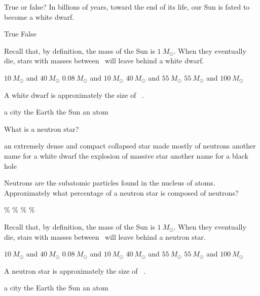 \documentclass[addpoints]{exam}
\begin{document}
\begin{questions}
\question
True or false? In billions of years, toward the end of its life, our Sun is fated to become a white dwarf.

\begin{randomizechoices}
\correctchoice True
\choice False
\end{randomizechoices}

\question 
Recall that, by definition, the mass of the Sun is $\SI{1}{M_{\odot}}$. When they eventually die, stars with masses between \fillin[][4cm]\ will leave behind a white dwarf.

\begin{randomizechoices}
\choice $\SI{10}{M_{\odot}}$ and $\SI{40}{M_{\odot}}$
\correctchoice $\SI{0.08}{M_{\odot}}$ and $\SI{10}{M_{\odot}}$
\choice $\SI{40}{M_{\odot}}$ and $\SI{55}{M_{\odot}}$
\choice $\SI{55}{M_{\odot}}$ and $\SI{100}{M_{\odot}}$
\end{randomizechoices}

\question
A white dwarf is approximately the size of \fillin\ .

\begin{randomizechoices}
\choice a city
\correctchoice the Earth
\choice the Sun
\choice an atom
\end{randomizechoices}

\clearpage
\question
What is a neutron star?

\begin{randomizechoices}
\correctchoice an extremely dense and compact collapsed star made mostly of neutrons
\choice another name for a white dwarf
\choice the explosion of massive star
\choice another name for a black hole
\end{randomizechoices}

\question
Neutrons are the subatomic particles found in the nucleus of atoms. Approximately what percentage of a neutron star is composed of neutrons?

\begin{randomizechoices}
\%
\%
\%
\%
\end{randomizechoices}

\question 
Recall that, by definition, the mass of the Sun is $\SI{1}{M_{\odot}}$. When they eventually die, stars with masses between \fillin[][4cm]\ will leave behind a neutron star.

\begin{randomizechoices}
\correctchoice $\SI{10}{M_{\odot}}$ and $\SI{40}{M_{\odot}}$
\choice $\SI{0.08}{M_{\odot}}$ and $\SI{10}{M_{\odot}}$
\choice $\SI{40}{M_{\odot}}$ and $\SI{55}{M_{\odot}}$
\choice $\SI{55}{M_{\odot}}$ and $\SI{100}{M_{\odot}}$
\end{randomizechoices}

\question
A neutron star is approximately the size of \fillin\ .

\begin{randomizechoices}
\correctchoice a city
\choice the Earth
\choice the Sun
\choice an atom
\end{randomizechoices}


\clearpage
\ifprintanswers
    \printkeytable
\fi
\end{questions}
\end{document}

